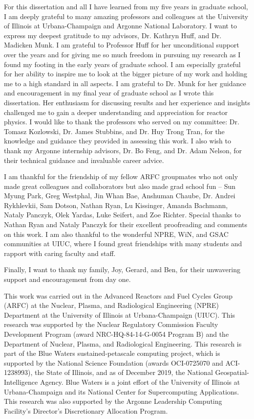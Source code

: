For this dissertation and all I have learned from my five years in graduate school, 
I am deeply grateful to many amazing professors and colleagues at the University of 
Illinois at Urbana-Champaign and Argonne National Laboratory. 
I want to express my deepest gratitude to my advisors, Dr. Kathryn Huff, and Dr. 
Madicken Munk. 
I am grateful to Professor Huff for her unconditional support over the years and for 
giving me so much freedom in pursuing my research as I found my footing in the early 
years of graduate school. 
I am especially grateful for her ability to inspire me to look at the bigger picture of 
my work and holding me to a high standard in all aspects.
I am grateful to Dr. Munk for her guidance and encouragement in my final year 
of graduate school as I wrote this dissertation. 
Her enthusiasm for discussing results and her experience and insights challenged me to 
gain a deeper understanding and appreciation for reactor physics.  
I would like to thank the professors who served on my committee: Dr. Tomasz 
Kozlowski, Dr. James Stubbins, and Dr. Huy Trong Tran, for the knowledge and guidance 
they provided in assessing this work. 
I also wish to thank my Argonne internship advisors, Dr. Bo Feng, and Dr. Adam Nelson, 
for their technical guidance and invaluable career advice. 

I am thankful for the friendship of my fellow ARFC 
groupmates who not only made great colleagues and collaborators but also made 
grad school fun -- Sun Myung Park, Greg Westphal, Jin Whan Bae, Anshuman Chaube, 
Dr. Andrei Rykhlevkii, Sam Dotson, Nathan Ryan, Lu Kissinger, Amanda Bachmann, 
Nataly Panczyk, Olek Yardas, Luke Seifert, and Zoe Richter. 
Special thanks to Nathan Ryan and Nataly Panczyk for their excellent proofreading 
and comments on this work. 
I am also thankful to the wonderful NPRE, WiN, and GSAC communities at UIUC, where 
I found great friendships with many students and rapport with caring faculty and staff. 

Finally, I want to thank my family, Joy, Gerard, and Ben, for their unwavering support 
and encouragement from day one. 

This work was carried out in the Advanced Reactors and Fuel Cycles Group (ARFC) at the 
Nuclear, Plasma, and Radiological Engineering (NPRE) Department at the University of 
Illinois at Urbana-Champaign (UIUC). 
This research was supported by the Nuclear Regulatory Commission Faculty Development 
Program (award NRC-HQ-84-14-G-0054 Program B) and the Department of Nuclear, Plasma, 
and Radiological Engineering.
This research is part of the Blue Waters sustained-petascale computing project, 
which is supported by the National Science Foundation (awards OCI-0725070 and 
ACI-1238993), the State of Illinois, and as of December 2019, the National 
Geospatial-Intelligence Agency. 
Blue Waters is a joint effort of the University of Illinois at Urbana-Champaign and 
its National Center for Supercomputing Applications.
This research was also supported by the Argonne Leadership Computing Facility's 
Director's Discretionary Allocation Program. 